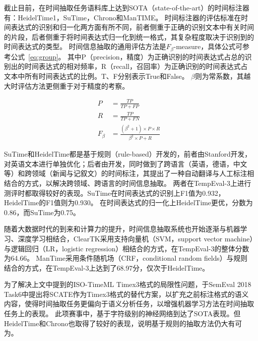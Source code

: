 截止目前，在时间抽取任务语料库上达到SOTA（state-of-the-art）的时间标注器有：HeidelTime1\cite{strotgen2010heideltime}，SuTime\cite{chang2012sutime}，Chrono\cite{olex2018chrono}和ManTIME\cite{filannino2013mantime}。
时间标注器的评估标准在时间表达式的识别和归一化两方面有所不同，前者侧重于正确的识别文本中有关时间的片段，后者侧重于将时间表达式归一化到统一格式，其复杂程度取决于识别到的时间表达式的类型。
时间信息抽取的通用评估方法是$F_β$-measure，具体公式可参考公式~\ref{eq:group}。
其中P（precision，精度）为正确识别的时间表达式占总的识别出的时间表达式的相对频率，R（recall，召回率）为正确识别的时间表达式占文本中所有时间表达式的比例。T、F分别表示True和False。
$\beta$则为常系数，其越大时评估方法更侧重于对于精度的考察。

\begin{subequations}\label{eq:group}
\begin{alignat}{1}
    P & = \frac{TP}{TP + FP} \\
    R & = \frac{TP}{TP + FN} \\
    F_\beta & = \frac{(\beta^2 + 1) \times P \times R}{\beta^2 \times P + R}
\end{alignat}
\end{subequations}

SuTime和HeidelTime都是基于规则（rule-based）开发的，前者由Stanford开发，对英语文本进行单独优化；后者由\citet{strotgen2010heideltime}开发，同时做到了跨语言（英语，德语，中文等）和跨领域（新闻与记叙文）的时间标注，其提出了一种自动翻译与人工标注相结合的方式，以解决跨领域、跨语言的时间信息抽取。
两者在TempEval-3上进行测评时都取得较好的表现。SuTime在时间表达式的识别上F1值为0.932，HeidelTime的F1值则为0.930。
在时间表达式的归一化上HeidelTime更优，分数为0.86，而SuTime为0.75。

随着大数据时代的到来和计算力的提升，时间信息抽取系统也开始逐渐与机器学习、深度学习相结合，ClearTK\cite{bethard2013cleartk}采用支持向量机（SVM，support vector machine）与逻辑回归（LR，logistic regression）相结合的方式，在TempEval-3的整体分数为64.66。
ManTime\cite{filannino2013mantime}采用条件随机场（CRF，conditional random fields）与规则结合的方式，在TempEval-3上达到了68.97分，仅次于HeidelTime。

为了解决上文中提到的ISO-TimeML Timex3格式的局限性问题，\citet{laparra2018characters}于SemEval 2018 Task6中提出将SCATE作为Timex3格式的替代方案，以扩充之前标注格式的语义内容，使得时间抽取任务更偏向于语义分析任务，以增强机器学习方法在时间抽取任务上的表现。
此项赛事中，\citet{laparra2018characters}基于字符级别的神经网络到达了SOTA表现。但HeidelTime和Chrono也取得了较好的表现，说明基于规则的抽取方法仍大有可为。

